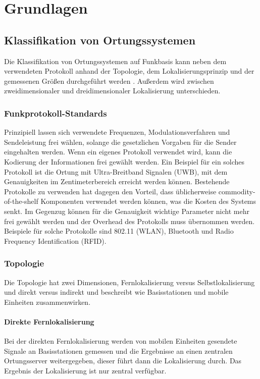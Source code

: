 \chapter{Grundlagen}
\label{ch:Grundlagen}

\section{Klassifikation von Ortungssystemen}
\label{ch:Einleitung:sec:Ortungssysteme}
Die Klassifikation von Ortungssystemen auf Funkbasis kann neben dem verwendeten Protokoll anhand der Topologie, dem Lokalisierungsprinzip und der gemessenen Größen durchgeführt werden \cite{liu2007survey}.
Außerdem wird zwischen zweidimensionaler und dreidimensionaler Lokalisierung unterschieden.

\subsection{Funkprotokoll-Standards}
Prinzipiell lassen sich verwendete Frequenzen, Modulationsverfahren und Sendeleistung frei wählen, solange die gesetzlichen Vorgaben für die Sender eingehalten werden. Wenn ein eigenes Protokoll verwendet wird, kann die Kodierung der Informationen frei gewählt werden. 
Ein Beispiel für ein solches Protokoll ist die Ortung mit Ultra-Breitband Signalen (UWB), mit dem Genauigkeiten im Zentimeterbereich erreicht werden können. Bestehende Protokolle zu verwenden hat dagegen den Vorteil, dass üblicherweise commodity-of-the-shelf Komponenten verwendet werden können, was die Kosten des Systems senkt. Im Gegenzug können für die Genauigkeit wichtige Parameter nicht mehr frei gewählt werden und der Overhead des Protokolls muss übernommen werden. Beispiele für solche Protokolle sind 802.11 (WLAN), Bluetooth und Radio Frequency Identification (RFID).

\subsection{Topologie}
Die Topologie hat zwei Dimensionen, Fernlokalisierung versus Selbstlokalisierung und direkt versus indirekt und beschreibt wie Basisstationen und mobile Einheiten zusammenwirken. \\

\subsubsection{Direkte Fernlokalisierung} 
Bei der direkten Fernlokalisierung werden von mobilen Einheiten gesendete Signale an Basisstationen gemessen und die Ergebnisse an einen zentralen Ortungsserver weitergegeben, dieser führt dann die Lokalisierung durch. Das Ergebnis der Lokalisierung ist nur zentral verfügbar. \\


